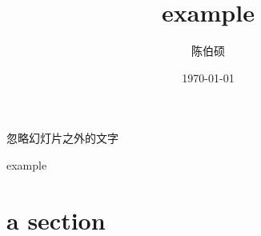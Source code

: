 \documentclass[slide]{myslide} %
\title{example}
\date{\today}
\author{陈伯硕}
\institute{github}
\begin{document}
\maketitle
忽略幻灯片之外的文字
\begin{frame}{example}
	\tableofcontents
\end{frame}

\section{a section}
\end{document}
